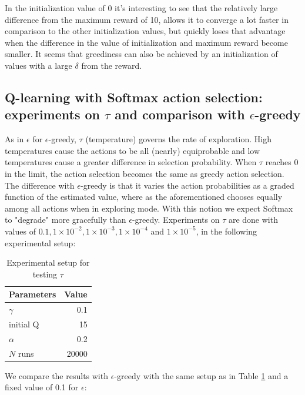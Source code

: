 \documentclass[paper=a4, fontsize=11pt]{scrartcl}
\numberwithin{equation}{section}		%
\numberwithin{figure}{section}			%
\numberwithin{table}{section}				%
\begin{document}
In the initialization value of 0 it's interesting to see that the relatively large difference from the maximum reward of 10, allows it to converge a lot faster in comparison to the other initialization values, but quickly loses that advantage when the difference in the value of initialization and maximum reward become smaller. It seems that greediness can also be achieved by an initialization of values with a large $\delta$ from the reward.

\subsection{Q-learning with Softmax action selection: experiments on $\tau$ and comparison with $\epsilon$-greedy}
As in $\epsilon$ for $\epsilon$-greedy, $\tau$ (temperature) governs the rate of exploration. High temperatures cause the actions to be all (nearly) equiprobable and low temperatures cause a greater difference in selection probability. When $\tau$ reaches 0 in the limit, the action selection becomes the same as greedy action selection. The difference with $\epsilon$-greedy is that it varies the action probabilities as a graded function of the estimated value, where as the aforementioned chooses equally among all actions when in exploring mode. With this notion we expect Softmax to "degrade" more gracefully than $\epsilon$-greedy. Experiments on $\tau$ are done with values of $0.1, 1 \times 10^{-2}, 1 \times 10^{-3}, 1 \times 10^{-4}$ and $1 \times 10^{-5}$, in the following experimental setup:
\begin{table}[H]
\caption{Experimental setup for testing $\tau$}
\centering
\begin{tabular}{|l|r|}
\hline
Parameters & Value \\\hline
$\gamma$ & 0.1 \\\hline
initial Q & 15 \\\hline
$\alpha$ & 0.2\\\hline
$N$ runs & 20000\\\hline
\end{tabular}
\label{expSetupSoftmax}
\end{table}
We compare the results with $\epsilon$-greedy with the same setup as in Table \ref{expSetupSoftmax} and a fixed value of 0.1 for $\epsilon$:
\end{document}
